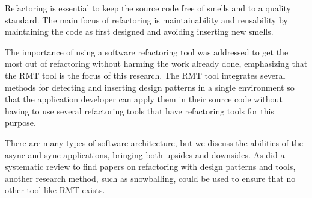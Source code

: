Refactoring is essential to keep the source code free of smells and to a quality standard. The main focus of refactoring is maintainability and reusability by maintaining the code as first designed and avoiding inserting new smells.

The importance of using a software refactoring tool was addressed to get the most out of refactoring without harming the work already done, emphasizing that the RMT tool is the focus of this research.
The RMT tool integrates several methods for detecting and inserting design patterns in a single environment so that the application developer can apply them in their source code without having to use several refactoring tools that have refactoring tools for this purpose.

There are many types of software architecture, but we discuss the abilities of the async and sync applications, bringing both upsides and downsides. As \textcite{beluzzo2018abordagem} did a systematic review to find papers on refactoring with design patterns and tools, another research method, such as snowballing, could be used to ensure that no other tool like RMT exists.
